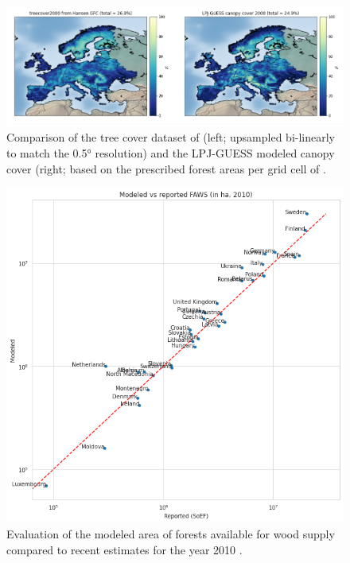 \documentclass[]{article}
\begin{document}
\begin{figure}
	\centering
	\includegraphics[width=0.7\linewidth]{supplement_figs/poultervshansen}
	\caption{Comparison of the tree cover dataset of \parencite{Hansen2013} (left; upsampled bi-linearly to match the 0.5° resolution) and the LPJ-GUESS modeled canopy cover (right; based on the prescribed forest areas per grid cell of \parencite{poulter2018tgfa}.}
	\label{fig:poultervshansen}
\end{figure}





\begin{figure}[h!]
	\centering
	\includegraphics[width=\linewidth]{supplement_figs/evalutation_faws.png}
	\caption{Evaluation of the modeled area of forests available for wood supply compared to recent estimates for the year 2010 \parencite{FORESTEUROPE2020}.}
	\label{fig:eval-faws}
\end{figure}
\end{document}
